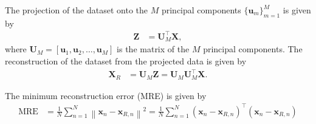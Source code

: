 The projection of the dataset onto the \( M \) principal components \( {\{ \mathbf{u}_m \}}_{m=1}^{M} \) is given by
\begin{align*}
    \mathbf{Z}
     & =
    \mathbf{U}_M^\top \mathbf{X},
\end{align*}
where \( \mathbf{U}_M = [\mathbf{u}_1, \mathbf{u}_2, \dots, \mathbf{u}_M] \) is the matrix of the \( M \) principal components.
The reconstruction of the dataset from the projected data is given by
\begin{align*}
    \mathbf{X}_{R}
     & =
    \mathbf{U}_M \mathbf{Z}
    =
    \mathbf{U}_M \mathbf{U}_M^\top \mathbf{X}.
\end{align*}

The minimum reconstruction error (MRE) is given by
\begin{align*}
    \text{MRE}
     & =
    \frac{1}{N} \sum_{n=1}^{N} \left \| \mathbf{x}_n - \mathbf{x}_{R, n} \right \|^2
    =
    \frac{1}{N} \sum_{n=1}^{N} (\mathbf{x}_n - \mathbf{x}_{R, n} )^\top (\mathbf{x}_n - \mathbf{x}_{R, n})
\end{align*}
